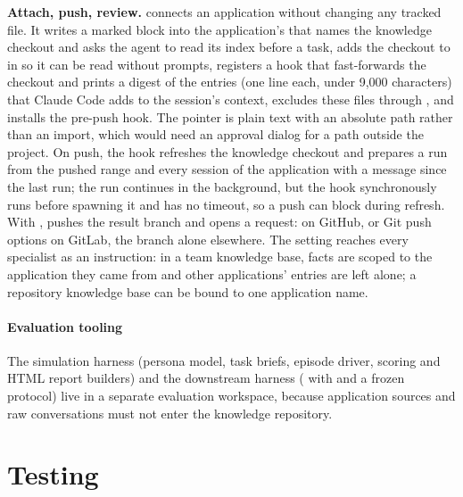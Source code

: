 \begin{sloppypar}\noindent\textbf{Attach, push, review.}  connects an application without changing any tracked file. It writes a marked block into the application's  that names the knowledge checkout and asks the agent to read its index before a task, adds the checkout to  in  so it can be read without prompts, registers a  hook that fast-forwards the checkout and prints a digest of the entries (one line each, under 9{,}000 characters) that Claude Code adds to the session's context, excludes these files through , and installs the pre-push hook. The pointer is plain text with an absolute path rather than an  import, which would need an approval dialog for a path outside the project. On push, the hook refreshes the knowledge checkout and prepares a run from the pushed range and every session of the application with a message since the last run; the run continues in the background, but the hook synchronously runs  before spawning it and has no timeout, so a push can block during refresh. With ,  pushes the result branch and opens a request:  on GitHub,  or Git push options on GitLab, the branch alone elsewhere. The  setting reaches every specialist as an instruction: in a team knowledge base, facts are scoped to the application they came from and other applications' entries are left alone; a repository knowledge base can be bound to one application name.\end{sloppypar}

\paragraph{Evaluation tooling} The simulation harness (persona model, task briefs, episode driver, scoring and HTML report builders) and the downstream harness ( with  and a frozen protocol) live in a separate evaluation workspace, because application sources and raw conversations must not enter the knowledge repository.

\section{Testing}

